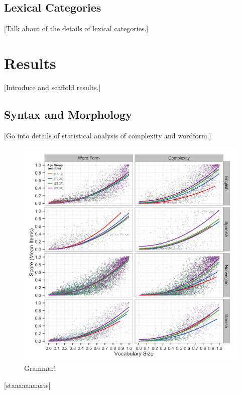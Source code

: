 \documentclass[10pt,letterpaper]{article}
\begin{document}
\subsection{Lexical Categories}
[Talk about of the details of lexical categories.]


\section{Results}

[Introduce and scaffold results.]

\subsection{Syntax and Morphology}

[Go into details of statistical analysis of complexity and wordform.]

\begin{figure}[!ht]
\begin{center}
\includegraphics[scale=0.8]{plots/grammar.png}
\end{center}
\caption{Grammar!} 
\label{grammar}
\end{figure}

[staaaaaaaaats]
\end{document}
